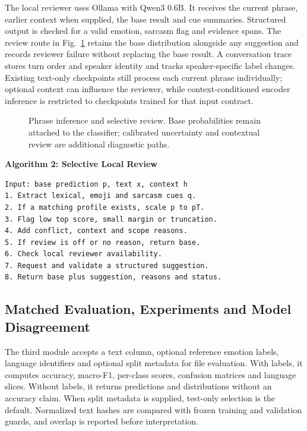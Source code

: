 \documentclass[journal]{IEEEtran}
\begin{document}
The local reviewer uses Ollama with Qwen3 0.6B. It receives the current phrase, earlier context when supplied, the base result and cue summaries. Structured output is checked for a valid emotion, sarcasm flag and evidence spans. The review route in Fig.~\ref{fig:prediction_review} retains the base distribution alongside any suggestion and records reviewer failure without replacing the base result. A conversation trace stores turn order and speaker identity and tracks speaker-specific label changes. Existing text-only checkpoints still process each current phrase individually; optional context can influence the reviewer, while context-conditioned encoder inference is restricted to checkpoints trained for that input contract.

\begin{figure}[!t]
\centering
\resizebox{.98\columnwidth}{!}{}
\caption{Phrase inference and selective review. Base probabilities remain attached to the classifier; calibrated uncertainty and contextual review are additional diagnostic paths.}\label{fig:prediction_review}
\end{figure}


\par\smallskip\noindent\begin{minipage}[t]{\columnwidth}
\textbf{Algorithm 2: Selective Local Review}
\begin{lstlisting}
Input: base prediction p, text x, context h
1. Extract lexical, emoji and sarcasm cues q.
2. If a matching profile exists, scale p to pT.
3. Flag low top score, small margin or truncation.
4. Add conflict, context and scope reasons.
5. If review is off or no reason, return base.
6. Check local reviewer availability.
7. Request and validate a structured suggestion.
8. Return base plus suggestion, reasons and status.
\end{lstlisting}
\end{minipage}\par\smallskip

\subsection{Matched Evaluation, Experiments and Model Disagreement}

The third module accepts a text column, optional reference emotion labels, language identifiers and optional split metadata for file evaluation. With labels, it computes accuracy, macro-F1, per-class scores, confusion matrices and language slices. Without labels, it returns predictions and distributions without an accuracy claim. When split metadata is supplied, test-only selection is the default. Normalized text hashes are compared with frozen training and validation guards, and overlap is reported before interpretation.
\end{document}
